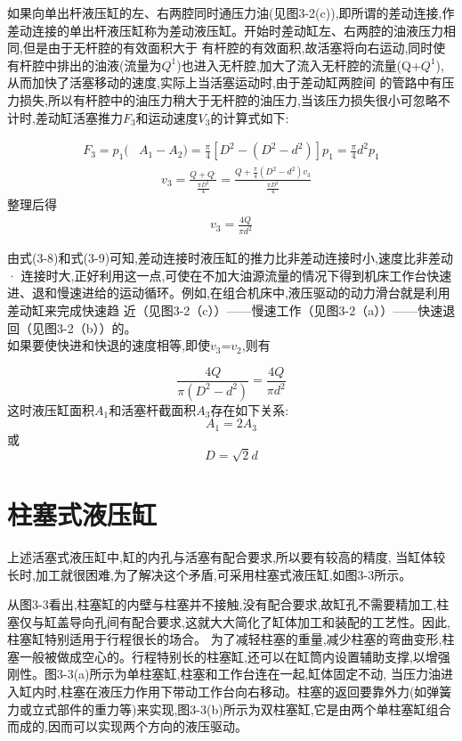 如果向单出杆液压缸的左、右两腔同时通压力油(见图3-2(c)),即所谓的差动连接,作差动连接的单出杆液压缸称为差动液压缸。开始时差动缸左、右两腔的油液压力相同,但是由于无杆腔的有效面积大于
有杆腔的有效面积,故活塞将向右运动,同时使有杆腔中排出的油液(流量为$Q^1$)也进入无杆腔,加大了流入无杆腔的流量(Q+$Q^1$),从而加快了活塞移动的速度,实际上当活塞运动时,由于差动缸两腔间
的管路中有压力损失,所以有杆腔中的油压力稍大于无杆腔的油压力,当该压力损失很小可忽略不计时,差动缸活塞推力$F_3$和运动速度$V_3$的计算式如下:
  

\begin{align}
    F_3=p_1(&A_1-A_2)=\frac{\pi}{4}[D^2-(D^2-d^2)]p_1=\frac{\pi}{4}d^2p_1
\end{align}
\begin{align*}
    &v_3=\displaystyle\frac{Q+Q^,}{\displaystyle\frac{\pi D^2}{4}}=\displaystyle\frac{Q+\displaystyle\frac{\pi}{4}(D^2-d^2)v_3}{\displaystyle\frac{\pi D^2}{4}}
\end{align*}
整理后得
\begin{align}
    v_3=\frac{4Q}{\pi d^2}
\end{align}

由式(3-8)和式(3-9)可知,差动连接时液压缸的推力比非差动连接时小,速度比非差动· 连接时大,正好利用这一点,可使在不加大油源流量的情况下得到机床工作台快速进、退和慢速进给的运动循环。例如,在组合机床中,液压驱动的动力滑台就是利用差动缸来完成快速趋
\newpage
\noindent
近（见图3-2（c））——慢速工作（见图3-2（a））——快速退回（见图3-2（b））的。\\
\indent
如果要使快进和快退的速度相等,即使$v_3$=$v_2$,则有

\begin{equation*}
\frac{4Q}{\pi(D^2-d^2)}=\frac{4Q}{\pi d^2}
\end{equation*}
\indent
这时液压缸面积$A_1$和活塞杆截面积$A_3$存在如下关系:
\begin{equation*}
    A_1=2A_3
\end{equation*}
或
\begin{equation}
    D=\sqrt{2}d    
\end{equation}
\section{柱塞式液压缸}
上述活塞式液压缸中,缸的内孔与活塞有配合要求,所以要有较高的精度,
当缸体较长时,加工就很困难,为了解决这个矛盾,可采用柱塞式液压缸,如图3-3所示。

从图3-3看出,柱塞缸的内壁与柱塞并不接触,没有配合要求,故缸孔不需要精加工,柱塞仅与缸盖导向孔间有配合要求,这就大大简化了缸体加工和装配的工艺性。因此,柱塞缸特别适用于行程很长的场合。
为了减轻柱塞的重量,减少柱塞的弯曲变形,柱塞一般被做成空心的。行程特别长的柱塞缸,还可以在缸筒内设置辅助支撑,以增强刚性。图3-3(a)所示为单柱塞缸,柱塞和工作台连在一起,缸体固定不动,
当压力油进入缸内时,柱塞在液压力作用下带动工作台向右移动。柱塞的返回要靠外力(如弹簧力或立式部件的重力等)来实现,图3-3(b)所示为双柱塞缸,它是由两个单柱塞缸组合而成的,因而可以实现两个方向的液压驱动。

